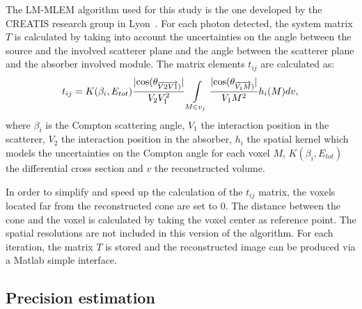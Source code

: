 The LM-MLEM algorithm used for this study is the one developed by the CREATIS research group in Lyon~\cite{maxim_filtered_2014,hilaire_compton_2014}.\newline%
For each photon detected, the system matrix $T$ is calculated by taking into account the uncertainties on the angle between the source and the involved scatterer plane and the angle between the scatterer plane and the absorber involved module.
The matrix elements $t_{ij}$ are calculated as:
\begin{equation}
 t_{ij} = K(\beta_i,E_{tot})\frac{|\rm{cos}(\theta_{\overrightarrow{V2V1})} |}{V_2V_1^2} \int\limits_{M\in v_j} \frac{|\rm{cos}(\theta_{\overrightarrow{V_1M})}| }{V_1M^2} h_i(M)dv,
 \label{eq:equation_tij_compton_med_nucleaire}\newline
\end{equation}
where $\beta_i$ is the Compton scattering angle, $V_1$ the interaction position in the scatterer, $V_2$ the interaction position in the absorber, $h_i$ the spatial kernel which models the uncertainties on the Compton angle for each voxel $M$, $K(\beta_i,E_{tot})$ the differential cross section and $v$ the reconstructed volume.\newline

In order to simplify and speed up the calculation of the $t_{ij}$ matrix, the voxels located far from the reconstructed cone are set to 0. The distance between the cone and the voxel is calculated by taking the voxel center as reference point. The spatial resolutions are not included in this version of the algorithm.\newline
For each iteration, the matrix $T$ is stored and the reconstructed image can be produced via a Matlab simple interface.

\subsection{Precision estimation}

